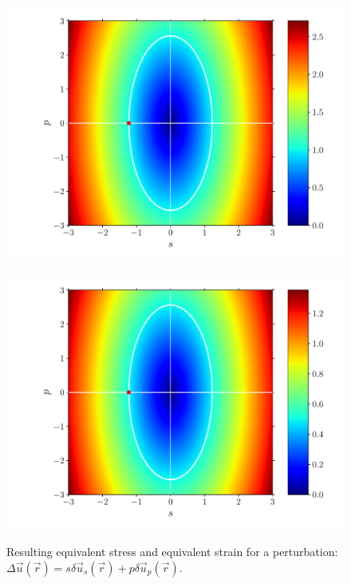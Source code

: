 \documentclass[fleqn]{goose-article}
\begin{document}
\begin{figure}[htp]
    \centering
    \captionsetup[subfigure]{justification=centering}
    \begin{minipage}[t]{.49\textwidth}
        \centering
        \includegraphics[width=\textwidth]{perturbation_phase-diagram_sig.pdf}
        \label{fig:phase-diagram:sig}
    \end{minipage}
    \hfill
    \begin{minipage}[t]{.49\textwidth}
        \centering
        \includegraphics[width=\textwidth]{perturbation_phase-diagram_eps.pdf}
        \label{fig:phase-diagram:eps}
    \end{minipage}
    \caption{
        Resulting
         equivalent stress and
         equivalent strain
        for a perturbation:
        $\Delta \vec{u}(\vec{r}) = s \delta \vec{u}_s (\vec{r}) + p \delta \vec{u}_p (\vec{r})$.
    }
    \label{fig:phase-diagram}
\end{figure}
\end{document}
